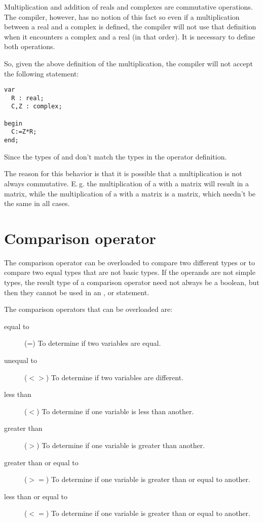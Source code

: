 Multiplication and addition of reals and complexes are commutative
operations. The compiler, however, has no notion of this fact so even
if a multiplication between a real and a complex is defined, the
compiler will not use that definition when it encounters a complex
and a real (in that order). It is necessary to define both operations.

So, given the above definition of the multiplication,
the compiler will not accept the following statement:
\begin{verbatim}
var
  R : real;
  C,Z : complex;

begin
  C:=Z*R;
end;
\end{verbatim}
Since the types of  and  don't match the types in the
operator definition.

The reason for this behavior is that it is possible that a multiplication
is not always commutative. E.\,g. the multiplication of a  with a
 matrix will result in a  matrix, while the
multiplication of a  with a  matrix is a 
matrix, which needn't be the same in all cases.

\section{Comparison operator}
The comparison operator can be overloaded to compare two different types
or to compare two equal types that are not basic types. If the operands
are not simple types, the result type of a comparison operator need not
always be a boolean, but then they cannot be used in an ,  or  statement.

The comparison operators that can be overloaded are:
\begin{description}
\item[equal to] (=) To determine if two variables are equal.
\item[unequal to] ($<>$) To determine if two variables are different.
\item[less than] ($<$) To determine if one variable is less than another.
\item[greater than] ($>$) To determine if one variable is greater than another.
\item[greater than or equal to] ($>=$) To determine if one variable is greater than
or equal to another.
\item[less than or equal to] ($<=$) To determine if one variable is greater
than or equal to another.
\end{description}

